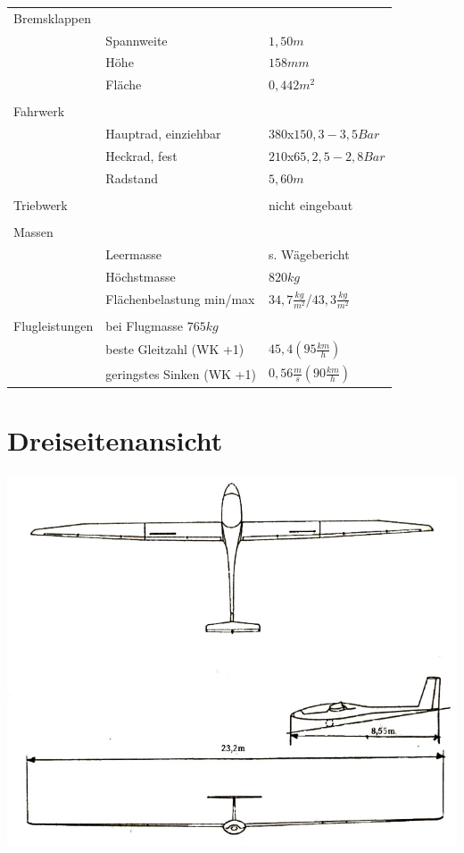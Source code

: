 \begin{longtable}{l l l}
 Bremsklappen & & \\
 & Spannweite & $1,50m$\\
 & Höhe & $158mm$ \\
 & Fläche & $0,442m^2$\\
 & & \\
 Fahrwerk & & \\
 & Hauptrad, einziehbar & $380$x$150, 3-3,5Bar$\\
 & Heckrad, fest & $210$x$65, 2,5-2,8Bar$\\
 & Radstand & $5,60m$\\
 & & \\
 Triebwerk & & nicht eingebaut\\
 & & \\
 Massen & & \\
 & Leermasse & s. Wägebericht\\
 & Höchstmasse & $820kg$\\
 & Flächenbelastung min/max & $34,7\frac{kg}{m^2}$/$43,3\frac{kg}{m^2}$\\
 & & \\
 Flugleistungen & bei Flugmasse $765kg$ & \\
 & beste Gleitzahl (WK +1) & $45,4 (95\frac{km}{h})$ \\
 & geringstes Sinken (WK +1) & $0,56\frac{m}{s} (90\frac{km}{h})$

\end{longtable}

\section{Dreiseitenansicht}
\includegraphics[width=\textwidth]{3seiten.jpg}